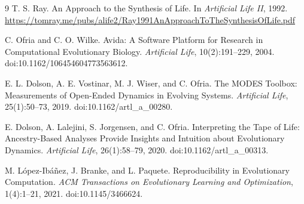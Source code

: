 \documentclass[10pt]{article}
\begin{document}
\begin{thebibliography}{9}
T. S. Ray. An Approach to the Synthesis of Life. In \emph{Artificial Life II}, 1992.
\url{https://tomray.me/pubs/alife2/Ray1991AnApproachToTheSynthesisOfLife.pdf}

C. Ofria and C. O. Wilke. Avida: A Software Platform for Research in
Computational Evolutionary Biology. \emph{Artificial Life}, 10(2):191--229,
2004. doi:10.1162/106454604773563612.

E. L. Dolson, A. E. Vostinar, M. J. Wiser, and C. Ofria. The MODES Toolbox:
Measurements of Open-Ended Dynamics in Evolving Systems. \emph{Artificial
Life}, 25(1):50--73, 2019. doi:10.1162/artl\_a\_00280.

E. Dolson, A. Lalejini, S. Jorgensen, and C. Ofria. Interpreting the Tape of
Life: Ancestry-Based Analyses Provide Insights and Intuition about Evolutionary
Dynamics. \emph{Artificial Life}, 26(1):58--79, 2020.
doi:10.1162/artl\_a\_00313.

M. L\'opez-Ib\'a\~nez, J. Branke, and L. Paquete. Reproducibility in
Evolutionary Computation. \emph{ACM Transactions on Evolutionary Learning and
Optimization}, 1(4):1--21, 2021. doi:10.1145/3466624.
\end{thebibliography}
\end{document}
